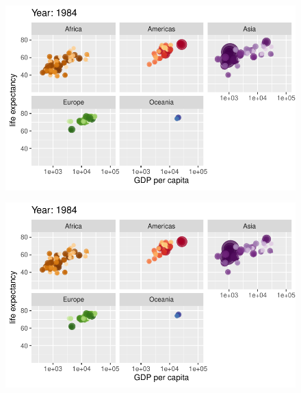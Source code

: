 \documentclass[
  letterpaper,
  DIV=11,
  numbers=noendperiod]{scrartcl}
\begin{document}
\begin{figure}[H]

{\centering \includegraphics{class05_files/figure-pdf/unnamed-chunk-24-58.pdf}

}

\end{figure}

\begin{figure}[H]

{\centering \includegraphics{class05_files/figure-pdf/unnamed-chunk-24-59.pdf}

}

\end{figure}
\end{document}
